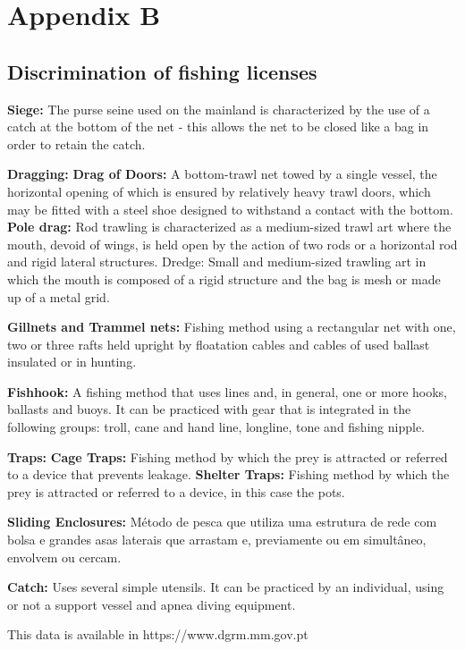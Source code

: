 \chapter{Appendix B} 
\label{anexo2}

\section{Discrimination of fishing licenses}

{\Large \textbf{ Siege:}}
The purse seine used on the mainland is characterized by the use of a catch at the bottom of the net - this allows the net to be closed like a bag in order to retain the catch.

{\Large\textbf{Dragging:}}
\textbf{Drag of Doors: }A bottom-trawl net towed by a single vessel, the horizontal opening of which is ensured by relatively heavy trawl doors, which may be fitted with a steel shoe designed to withstand a contact with the bottom.
\textbf{Pole drag:} Rod trawling is characterized as a medium-sized trawl art where the mouth, devoid of wings, is held open by the action of two rods or a horizontal rod and rigid lateral structures.
Dredge: Small and medium-sized trawling art in which the mouth is composed of a rigid structure and the bag is mesh or made up of a metal grid.

{\Large\textbf{Gillnets and Trammel nets:}}
Fishing method using a rectangular net with one, two or three rafts held upright by floatation cables and cables of used ballast insulated or in hunting.

{\Large\textbf{Fishhook:}}
A fishing method that uses lines and, in general, one or more hooks, ballasts and buoys. It can be practiced with gear that is integrated in the following groups: troll, cane and hand line, longline, tone and fishing nipple.

{\Large\textbf{Traps:}}
\textbf{Cage Traps:} Fishing method by which the prey is attracted or referred to a device that prevents leakage. 
\textbf{Shelter Traps:} Fishing method by which the prey is attracted or referred to a device, in this case the pots.

{\Large\textbf{Sliding Enclosures:}}
Método de pesca que utiliza uma estrutura de rede com bolsa e grandes asas laterais que arrastam e, previamente ou em simultâneo, envolvem ou cercam.

{\Large\textbf{Catch:}}
Uses several simple utensils. It can be practiced by an individual, using or not a support vessel and apnea diving equipment.

This data is available in https://www.dgrm.mm.gov.pt 
